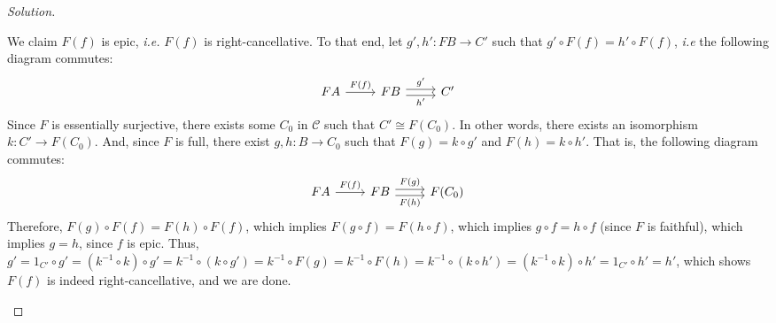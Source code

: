 \documentclass[]{amsbook}
\newcommand{\0}{\mathbf{0}}
\newcommand{\1}{\mathbf{1}}
\newcommand{\mc}[1]{\mathcal{#1}}
\newenvironment{solution}
    {\begin{proof}[Solution]}{\end{proof}}
\begin{document}
\begin{solution}
\begin{enumerate}
    We claim $F(f)$ is epic, \emph{i.e.} $F(f)$ is right-cancellative. To that
    end, let $g', h': FB \to C'$ such that $g' \circ F(f) = h' \circ F(f)$,
    \emph{i.e} the following diagram commutes:
    \[
    \begin{tikzcd}
        FA \arrow[r, "F(f)"]
           & FB \arrow[r, shift left, "g'"]
                \arrow[r, shift right, swap, "h'"]
                & C'
    \end{tikzcd}
    \]
    Since $F$ is essentially surjective, there exists some $C_0$ in $\mc{C}$
    such that $C' \cong F(C_0)$. In other words, there exists an isomorphism
    $k: C' \to F(C_0)$. And, since $F$ is full, there exist $g, h: B \to C_0$
    such that $F(g) = k \circ g'$ and $F(h) = k \circ h'$. That is, the
    following diagram commutes:
    \[
    \begin{tikzcd}
    FA \arrow[r, "F(f)"]
       & FB \arrow[r, shift left, "F(g)"]
            \arrow[r, shift right, swap, "F(h)"]
            & F(C_0)
    \end{tikzcd}
    \]
    Therefore, $F(g) \circ F(f) = F(h) \circ F(f)$, which implies $F(g \circ f)
    = F(h \circ f)$, which implies $g \circ f = h \circ f$ (since $F$ is
    faithful), which implies $g = h$, since $f$ is epic. Thus, $g' = 1_{C'}
    \circ g' = (k^{-1} \circ k) \circ g' = k^{-1} \circ (k \circ g') = k^{-1}
    \circ F(g) = k^{-1} \circ F(h) = k^{-1} \circ (k \circ h') = (k^{-1} \circ
    k) \circ h' = 1_{C'} \circ h' = h'$, which shows $F(f)$ is indeed
    right-cancellative, and we are done.
\end{enumerate}
\end{solution}
\end{document}
